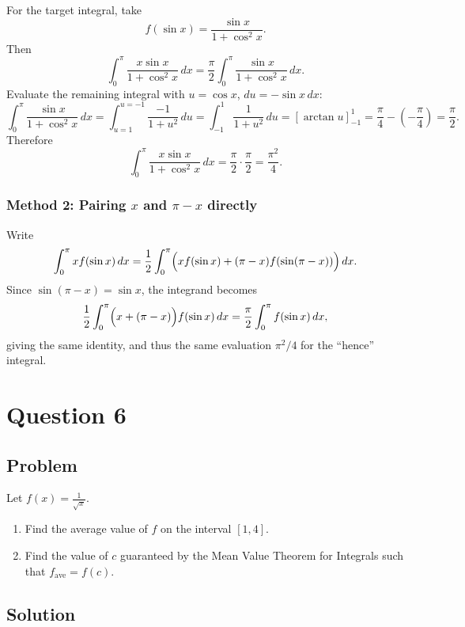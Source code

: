 \documentclass[12pt]{article}
\begin{document}
For the target integral, take
\[
f(\sin x)=\frac{\sin x}{1+\cos^2 x}.
\]
Then
\[
\int_{0}^{\pi}\frac{x\sin x}{1+\cos^2 x}\,dx
=\frac{\pi}{2}\int_{0}^{\pi}\frac{\sin x}{1+\cos^2 x}\,dx.
\]
Evaluate the remaining integral with \(u=\cos x\), \(du=-\sin x\,dx\):
\[
\int_{0}^{\pi}\frac{\sin x}{1+\cos^2 x}\,dx
=\int_{u=1}^{u=-1}\frac{-1}{1+u^2}\,du
=\int_{-1}^{1}\frac{1}{1+u^2}\,du
=\left[\arctan u\right]_{-1}^{1}
=\frac{\pi}{4}-\left(-\frac{\pi}{4}\right)
=\frac{\pi}{2}.
\]
Therefore
\[
\int_{0}^{\pi}\frac{x\sin x}{1+\cos^2 x}\,dx
=\frac{\pi}{2}\cdot \frac{\pi}{2}
=\frac{\pi^2}{4}.
\]

\subsubsection*{Method 2: Pairing \(x\) and \(\pi-x\) directly}

Write
\[
\int_{0}^{\pi} x f(\sin x)\,dx
=\frac{1}{2}\int_{0}^{\pi}\Bigl(x f(\sin x)+(\pi-x)f(\sin(\pi-x))\Bigr)\,dx.
\]
Since \(\sin(\pi-x)=\sin x\), the integrand becomes
\[
\frac{1}{2}\int_{0}^{\pi}\Bigl(x+(\pi-x)\Bigr)f(\sin x)\,dx
=\frac{\pi}{2}\int_{0}^{\pi}f(\sin x)\,dx,
\]
giving the same identity, and thus the same evaluation \(\pi^2/4\) for the ``hence'' integral.

\bigskip


\newpage

\section*{Question 6}

\subsection*{Problem}

Let \(f(x)=\frac{1}{\sqrt{x}}\).
\begin{enumerate}[label=(\roman*)]
\item Find the average value of \(f\) on the interval \([1,4]\).
\item Find the value of \(c\) guaranteed by the Mean Value Theorem for Integrals such that \(f_{\text{ave}}=f(c)\).
\end{enumerate}

\subsection*{Solution}
\end{document}
